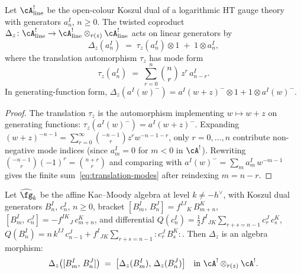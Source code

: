 \begin{proposition}
\label{prop:twisted-coproduct-modes}
Let $\cA^!_{\mathrm{line}}$ be the open-colour Koszul dual of a
logarithmic HT gauge theory with generators $a^I_n$, $n \ge 0$.
The twisted coproduct $\Delta_z \colon \cA^!_{\mathrm{line}} \to
\cA^!_{\mathrm{line}} \otimes_{r(z)} \cA^!_{\mathrm{line}}$
acts on linear generators by
\begin{equation}\label{eq:coproduct-mode}
 \Delta_z(a^I_n) \;=\; \tau_z(a^I_n) \otimes 1
 \;+\; 1 \otimes a^I_n,
\end{equation}
where the translation automorphism $\tau_z$ has mode form
\begin{equation}\label{eq:translation-modes}
 \tau_z(a^I_n) \;=\; \sum_{r=0}^{n} \binom{n}{r}\, z^r\,
 a^I_{n-r}.
\end{equation}
In generating-function form, $\Delta_z(a^I(w)^-)
= a^I(w+z)^- \otimes 1 + 1 \otimes a^I(w)^-$.
\end{proposition}

\begin{proof}
The translation $\tau_z$ is the automorphism implementing
$w \mapsto w + z$ on generating functions:
$\tau_z(a^I(w)^-) = a^I(w+z)^-$. Expanding
$(w+z)^{-n-1} = \sum_{r=0}^\infty \binom{-n-1}{r} z^r
w^{-n-1-r}$, only $r = 0, \ldots, n$ contribute non-negative
mode indices (since $a^I_m = 0$ for $m < 0$ in $\cA^!$).
Rewriting $\binom{-n-1}{r}(-1)^r = \binom{n+r}{r}$ and
comparing with $a^I(w)^- = \sum_m a^I_m\, w^{-m-1}$ gives
the finite sum~\eqref{eq:translation-modes} after reindexing
$m = n - r$.
\end{proof}

\begin{proposition}
\label{prop:coproduct-morphism}
Let $\widehat{\fg}_k$ be the affine Kac--Moody algebra at level
$k \neq -h^\vee$, with Koszul dual generators
$B^I_n$, $c^I_n$, $n \ge 0$, bracket
$[B^I_m,\, B^J_n] = f^{IJ}{}_K\, B^K_{m+n}$,
$[B^I_m,\, c^J_n] = -f^{IK}{}_J\, c^K_{m+n}$,
and differential
$Q(c^I_n) = \tfrac{1}{2} f^I{}_{JK}
\sum_{r+s = n-1} c^J_r\, c^K_s$,
$Q(B^I_n) = n\, k^{IJ}\, c^J_{n-1}
+ f^I{}_{JK}\sum_{r+s=n-1}{:}c^J_r\, B^K_s{:}$.
Then $\Delta_z$ is an algebra morphism:
\begin{equation}\label{eq:morphism-check}
 \Delta_z\bigl([B^I_m,\, B^J_n]\bigr)
 \;=\; \bigl[\Delta_z(B^I_m),\, \Delta_z(B^J_n)\bigr]
 \quad\text{in } \cA^! \otimes_{r(z)} \cA^!.
\end{equation}
\end{proposition}

